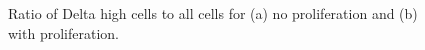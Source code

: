 \documentclass[12pt]{article}
\begin{document}

\begin{figure}
\centering
\setlength{\unitlength}{1cm}
\caption{Ratio of Delta high cells to all cells for (a) no proliferation and  (b) with proliferation.}
\label{fig:DeltaNotchStats:metrics}
\end{figure}

\end{document}
